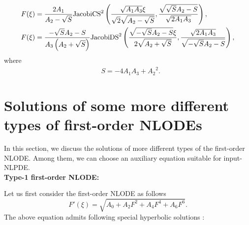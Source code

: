 \documentclass[prd,aps,floats,showkeys,nofootinbib,notitlepage]{revtex4-2}
\begin{document}
\begin{subequations}
\begin{align}
			&F(\xi)=   \frac{{2{A_1}}}{{{A_2} - \sqrt S }}{\text{JacobiC}}{{\text{S}}^2}\left( {\frac{{\sqrt {{A_1} {A_3}} \xi }}{{\sqrt 2 \sqrt {{A_2} - \sqrt S } }}, \frac{{\sqrt {\sqrt S {A_2} - S}  }}{{\sqrt {2{A_1} {A_3}} }}} \right), \hfill \\
			&F(\xi)=   \frac{{ - \sqrt S {A_2} - S}}{{{A_3}\left( {{A_2} + \sqrt S } \right)}}{\text{JacobiD}}{{\text{S}}^2}\left( {\frac{{\sqrt { - \sqrt S {A_2} - S} \xi }}{{2\sqrt {{A_2} + \sqrt S } }},\frac{{ \sqrt {2{A_1} {A_3}} }}{{\sqrt { - \sqrt S {A_2} - S} }}} \right),
		\end{align}
	\end{subequations}
	where
	\begin{align}  
		&S =  - 4 {A_1} {A_3} + {A_2}^2.
	\end{align}
	
	\renewcommand{\theequation}{D-\arabic{equation}}
	\section{Solutions of some more different types of first-order NLODEs}\label{sec:appenD}
	In this section, we discuss the solutions of more different types of the first-order NLODE. Among them, we can choose an auxiliary equation suitable for input-NLPDE.\\ 
	\textbf{Type-1 first-order NLODE:}
	\par Let us first consider the first-order NLODE as follows 
	\begin{equation}\label{0246}
		F'(\xi ) = \sqrt{{A_0} + {A_2}{F^2} + {A_4}{F^4} + {A_6}{F^6}}.
	\end{equation}
	The above equation admits following special hyperbolic solutions \cite{0246}:
	
\end{document}
